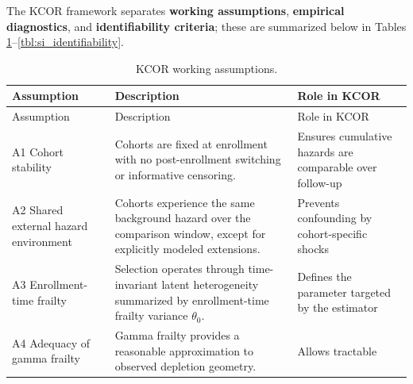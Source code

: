 \documentclass[
]{article}
\begin{document}
The KCOR framework separates \textbf{working assumptions},
\textbf{empirical diagnostics}, and \textbf{identifiability criteria};
these are summarized below in Tables
\ref{tbl:si_assumptions}--\ref{tbl:si_identifiability}.

\begin{longtable}[]{@{}
  >{\raggedright\arraybackslash}p{}
  >{\raggedright\arraybackslash}p{}
  >{\raggedright\arraybackslash}p{}@{}}
\caption{KCOR working
assumptions.}\label{tbl:si_assumptions}\tabularnewline
\toprule\noalign{}
\begin{minipage}[b]{\linewidth}\raggedright
Assumption
\end{minipage} & \begin{minipage}[b]{\linewidth}\raggedright
Description
\end{minipage} & \begin{minipage}[b]{\linewidth}\raggedright
Role in KCOR
\end{minipage} \\
\midrule\noalign{}
\endfirsthead
\toprule\noalign{}
\begin{minipage}[b]{\linewidth}\raggedright
Assumption
\end{minipage} & \begin{minipage}[b]{\linewidth}\raggedright
Description
\end{minipage} & \begin{minipage}[b]{\linewidth}\raggedright
Role in KCOR
\end{minipage} \\
\midrule\noalign{}
\endhead
\bottomrule\noalign{}
\endlastfoot
A1 Cohort stability & Cohorts are fixed at enrollment with no
post-enrollment switching or informative censoring. & Ensures cumulative
hazards are comparable over follow-up \\
A2 Shared external hazard environment & Cohorts experience the same
background hazard over the comparison window, except for explicitly
modeled extensions. & Prevents confounding by cohort-specific shocks \\
A3 Enrollment-time frailty & Selection operates through time-invariant
latent heterogeneity summarized by enrollment-time frailty variance
\(\theta_0\). & Defines the parameter targeted by the estimator \\
A4 Adequacy of gamma frailty & Gamma frailty provides a reasonable
approximation to observed depletion geometry. & Allows tractable

\end{longtable}
\end{document}
